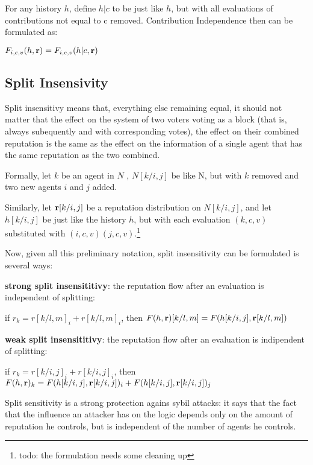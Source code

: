 \documentclass{article}
\begin{document}
For any history $h$, define $h | c$ to be just like $h$, but with all evaluations of contributions not equal to c removed. Contribution Independence then can be formulated as:

\begin{center}
$F_{i,c,v}(h, {\bf r}) = F_{i,c,v}(h|c, {\bf r}) $
\end{center}

\subsection{Split Insensivity}

Split insensitivy means that, everything else remaining equal, it should not matter that the effect on the system of two voters voting as a block (that is, always subequently and with corresponding votes), the effect on their combined reputation is the same as the effect on the information of a single agent that has the same reputation as the two combined.

Formally, let $k$ be an agent in $N$ , $N[k/{i,j}]$ be like N, but with $k$ removed and two new agents $i$ and $j$ added.

Similarly, let ${\bf r}[k/{i,j}]$ be a reputation distribution on $N[k/{i,j}]$, and let $h[k/{i,j}]$ be just like the history $h$, but with each evaluation $(k, c, v)$ substituted with $(i, c, v) (j, c, v)$.\footnote{todo: the formulation needs some cleaning up}

Now, given all this preliminary notation, split insensitivity can be formulated is several ways:

{\bf strong split insensititivy}: the reputation flow after an evaluation is independent of splitting:
\begin{center}
if $r_k = r[k/{l,m}]_i +r[k/{l,m}]_i$, then $F(h, {\bf r})[k/{l, m}] = F(h[k/{i,j}], {\bf r}[k/{l,m}])$
\end{center}


{\bf weak split insensititivy}: the reputation flow after an evaluation is indipendent of splitting:
\begin{center}
if $r_k = r[k/{i,j}]_i +r[k/{i,j}]_i$, then $F(h, {\bf r})_k = F(h[k/{i,j}], {\bf r}[k/{i,j}])_i + F(h[k/{i,j}], {\bf r}[k/{i,j}])_j$
\end{center}
Split sensitivity is a strong protection agains sybil attacks: it says that the fact that the influence an attacker has on the logic depends only on the amount of reputation he controls, but is independent of the number of agents he controls.
\end{document}
